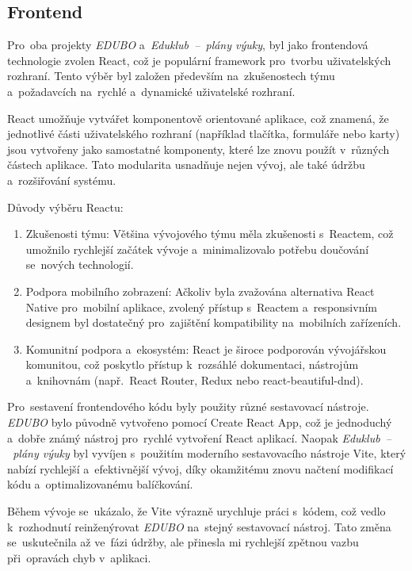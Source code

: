 \documentclass[male,czech,api_bc]{kitheses}
\begin{document}
\subsection{Frontend}

Pro~oba projekty \textit{EDUBO} a~\textit{Eduklub~--~plány výuky}, byl jako frontendová technologie zvolen React, což je populární framework pro~tvorbu uživatelských rozhraní. Tento výběr byl založen především na~zkušenostech týmu a~požadavcích na~rychlé a~dynamické uživatelské rozhraní.

React umožňuje vytvářet komponentově orientované aplikace, což znamená, že jednotlivé části uživatelského rozhraní (například tlačítka, formuláře nebo karty) jsou vytvořeny jako samostatné komponenty, které lze znovu použít v~různých částech aplikace. Tato modularita usnadňuje nejen vývoj, ale také údržbu a~rozšiřování systému.\cite[s.~109]{react}

Důvody výběru Reactu:
\begin{enumerate}
	\item Zkušenosti týmu: Většina vývojového týmu měla zkušenosti s~Reactem, což umožnilo rychlejší začátek vývoje a~minimalizovalo potřebu doučování se~nových technologií.
	\item Podpora mobilního zobrazení: Ačkoliv byla zvažována alternativa React Native pro~mobilní aplikace, zvolený přístup s~Reactem a~responsivním designem byl dostatečný pro~zajištění kompatibility na~mobilních zařízeních.
	\item Komunitní podpora a~ekosystém: React je široce podporován vývojářskou komunitou, což poskytlo přístup k~rozsáhlé dokumentaci, nástrojům a~knihovnám (např.~React Router, Redux nebo react-beautiful-dnd).
\end{enumerate}

Pro~sestavení frontendového kódu byly použity různé sestavovací nástroje. \textit{EDUBO} bylo původně vytvořeno pomocí Create React App, což je jednoduchý a~dobře známý nástroj pro~rychlé vytvoření React aplikací. Naopak \textit{Eduklub~--~plány výuky} byl vyvíjen s~použitím moderního sestavovacího nástroje Vite, který nabízí rychlejší a~efektivnější vývoj, díky okamžitému znovu načtení modifikací kódu a~optimalizovanému balíčkování.

Během vývoje se~ukázalo, že Vite výrazně urychluje práci s~kódem, což vedlo k~rozhodnutí reinženýrovat \textit{EDUBO} na~stejný sestavovací nástroj. Tato změna se~uskutečnila až ve~fázi údržby, ale přinesla mi rychlejší zpětnou vazbu při~opravách chyb v~aplikaci.
\end{document}
